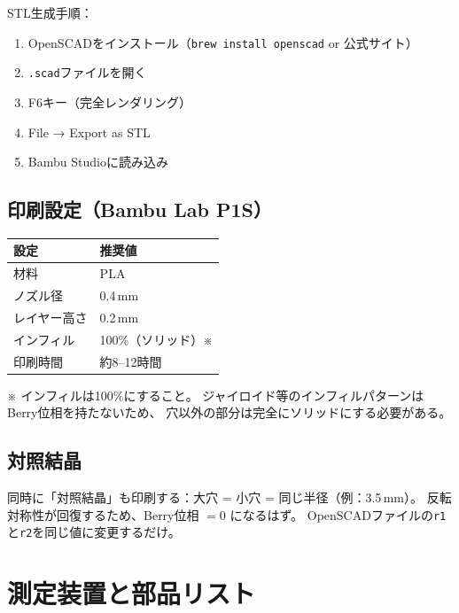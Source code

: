 \documentclass[11pt,a4paper]{article}
\def\textbf#1{#1}%
\begin{document}
\textbf{STL生成手順}：
\begin{enumerate}
\item OpenSCADをインストール（\texttt{brew install openscad} or 公式サイト）
\item \texttt{.scad}ファイルを開く
\item F6キー（完全レンダリング）
\item File → Export as STL
\item Bambu Studioに読み込み
\end{enumerate}

\subsection{印刷設定（Bambu Lab P1S）}

\begin{center}
\begin{tabular}{ll}
\toprule
設定 & 推奨値 \\
\midrule
材料 & PLA \\
ノズル径 & 0.4\,mm \\
レイヤー高さ & 0.2\,mm \\
インフィル & \textbf{100\%（ソリッド）}※ \\
印刷時間 & 約8--12時間 \\
\bottomrule
\end{tabular}
\end{center}

※ インフィルは100\%にすること。
ジャイロイド等のインフィルパターンはBerry位相を持たないため、
穴以外の部分は完全にソリッドにする必要がある。

\subsection{対照結晶}

同時に「対照結晶」も印刷する：大穴 = 小穴 = 同じ半径（例：3.5\,mm）。
反転対称性が回復するため、Berry位相 $= 0$ になるはず。
OpenSCADファイルの\texttt{r1}と\texttt{r2}を同じ値に変更するだけ。


\section{測定装置と部品リスト}
\end{document}
